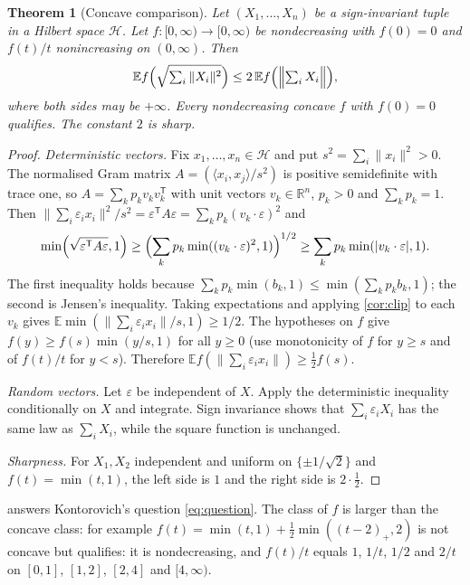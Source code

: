 \documentclass[11pt,a4paper]{article}
\numberwithin{equation}{section}
\newtheorem{theorem}{Theorem}[section]
\theoremstyle{remark}
\newcommand{\E}{\mathbb E}
\newcommand{\R}{\mathbb R}
\newcommand{\cH}{\mathcal H}
\begin{document}
\begin{theorem}[Concave comparison]\label{thm:hilbert}
Let $(X_1,\ldots,X_n)$ be a sign-invariant tuple in a Hilbert space $\cH$.
Let $f\colon[0,\infty)\to[0,\infty)$ be nondecreasing with $f(0)=0$ and
$f(t)/t$ nonincreasing on $(0,\infty)$. Then
\[
 \E f\Bigl(\sqrt{\textstyle\sum_i\|X_i\|^2}\Bigr)
 \le2\,\E f\Bigl(\Bigl\|\textstyle\sum_iX_i\Bigr\|\Bigr),
\]
where both sides may be $+\infty$. Every nondecreasing concave $f$ with
$f(0)=0$ qualifies. The constant $2$ is sharp.
\end{theorem}

\begin{proof}
\emph{Deterministic vectors.} Fix $x_1,\ldots,x_n\in\cH$ and put
$s^2=\sum_i\|x_i\|^2>0$. The normalised Gram matrix
$A=(\langle x_i,x_j\rangle/s^2)$ is positive semidefinite with trace one,
so $A=\sum_kp_kv_kv_k^{\mathsf T}$ with unit vectors $v_k\in\R^n$,
$p_k>0$ and $\sum_kp_k=1$. Then
$\|\sum_i\varepsilon_ix_i\|^2/s^2=\varepsilon^{\mathsf T}A\varepsilon
=\sum_kp_k(v_k\cdot\varepsilon)^2$ and
\begin{equation}\label{eq:lift}
 \min\Bigl(\sqrt{\varepsilon^{\mathsf T}A\varepsilon},1\Bigr)
 \ge\Bigl(\sum_kp_k\min((v_k\cdot\varepsilon)^2,1)\Bigr)^{1/2}
 \ge\sum_kp_k\min(|v_k\cdot\varepsilon|,1).
\end{equation}
The first inequality holds because $\sum_kp_k\min(b_k,1)\le\min(\sum_kp_kb_k,1)$;
the second is Jensen's inequality. Taking expectations and applying
\cref{cor:clip} to each $v_k$ gives
$\E\min(\|\sum_i\varepsilon_ix_i\|/s,1)\ge1/2$. The hypotheses on $f$ give
$f(y)\ge f(s)\min(y/s,1)$ for all $y\ge0$ (use monotonicity of $f$ for
$y\ge s$ and of $f(t)/t$ for $y<s$). Therefore
$\E f(\|\sum_i\varepsilon_ix_i\|)\ge\tfrac12f(s)$.

\emph{Random vectors.} Let $\varepsilon$ be independent of $X$. Apply the
deterministic inequality conditionally on $X$ and integrate. Sign invariance
shows that $\sum_i\varepsilon_iX_i$ has the same law as $\sum_iX_i$, while
the square function is unchanged.

\emph{Sharpness.} For $X_1,X_2$ independent and uniform on
$\{\pm1/\sqrt2\}$ and $f(t)=\min(t,1)$, the left side is $1$ and the right
side is $2\cdot\tfrac12$.
\end{proof}

 answers Kontorovich's question \eqref{eq:question}. The
class of $f$ is larger than the concave class: for example
$f(t)=\min(t,1)+\tfrac12\min((t-2)_+,2)$ is not concave but qualifies:
it is nondecreasing, and $f(t)/t$ equals $1$, $1/t$, $1/2$ and $2/t$ on
$[0,1]$, $[1,2]$, $[2,4]$ and $[4,\infty)$.
\end{document}
